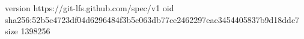 version https://git-lfs.github.com/spec/v1
oid sha256:52b5c4723df04d6296484f3b5c063db77ce2462297eac3454405837b9d18ddc7
size 1398256
